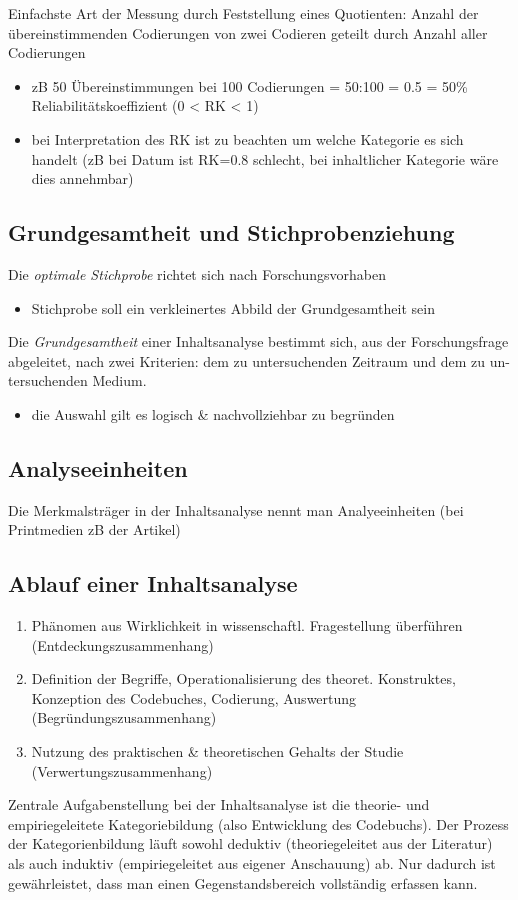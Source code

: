 \documentclass[11pt]{article}
\begin{document}
Einfachste Art der Messung durch Feststellung eines Quotienten: Anzahl der übereinstimmenden Codierungen von zwei Codieren geteilt durch Anzahl aller Codierungen
\begin{itemize}
\item zB 50 Übereinstimmungen bei 100 Codierungen = 50:100 = 0.5 = 50\% Reliabilitätskoeffizient (0 < RK < 1)
\item bei Interpretation des RK ist zu beachten um welche Kategorie es sich handelt (zB bei Datum ist RK=0.8 schlecht, bei inhaltlicher Kategorie wäre dies annehmbar)
\end{itemize}
\subsection{Grundgesamtheit und Stichprobenziehung}
\label{sec:org41e98a7}
Die \emph{optimale Stichprobe} richtet sich nach Forschungsvorhaben
\begin{itemize}
\item Stichprobe soll ein verkleinertes Abbild der Grundgesamtheit sein
\end{itemize}

Die \emph{Grundgesamtheit} einer Inhaltsanalyse bestimmt sich, aus der Forschungsfrage
abgeleitet, nach zwei Kriterien: dem zu untersuchenden Zeitraum und dem zu un-
tersuchenden Medium.
\begin{itemize}
\item die Auswahl gilt es logisch \& nachvollziehbar zu begründen
\end{itemize}
\subsection{Analyseeinheiten}
\label{sec:org4b68233}
Die Merkmalsträger in der Inhaltsanalyse nennt man Analyeeinheiten (bei Printmedien zB der Artikel)
\subsection{Ablauf einer Inhaltsanalyse}
\label{sec:org70fb335}
\begin{enumerate}
\item Phänomen aus Wirklichkeit in wissenschaftl. Fragestellung überführen (Entdeckungszusammenhang)
\item Definition der Begriffe, Operationalisierung des theoret. Konstruktes, Konzeption des Codebuches, Codierung, Auswertung (Begründungszusammenhang)
\item Nutzung des praktischen \& theoretischen Gehalts der Studie (Verwertungszusammenhang)
\end{enumerate}

Zentrale Aufgabenstellung bei der Inhaltsanalyse ist die theorie- und empiriegeleitete Kategoriebildung (also Entwicklung des Codebuchs).
Der Prozess der Kategorienbildung läuft sowohl deduktiv (theoriegeleitet aus der Literatur) als auch induktiv (empiriegeleitet aus eigener Anschauung) ab. Nur dadurch ist gewährleistet, dass man einen Gegenstandsbereich vollständig erfassen kann.
\end{document}
